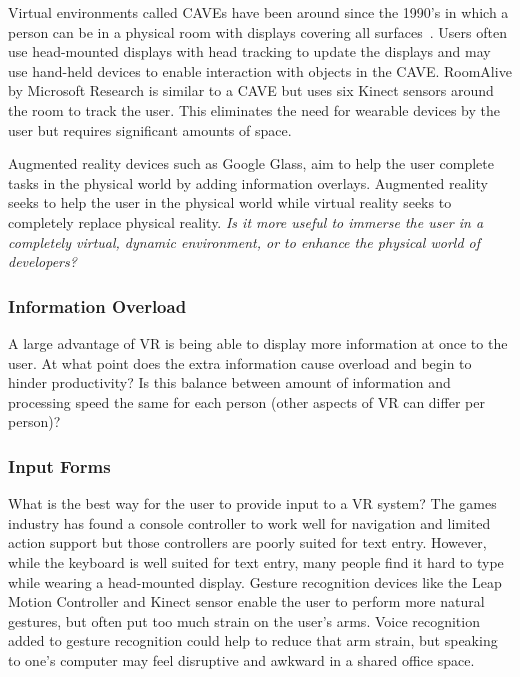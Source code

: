 \documentclass[conference]{IEEEtran}
\begin{document}
Virtual environments called CAVEs have been around since the 1990's in which a person can be in a physical room with displays covering all surfaces~\cite{Cruz-Neira:CAVE}.  
Users often use head-mounted displays with head tracking to update the displays and may use hand-held devices to enable interaction with objects in the CAVE.
RoomAlive by Microsoft Research is similar to a CAVE but uses six Kinect sensors around the room to track the user.  This eliminates the need for wearable devices by the user but requires significant amounts of space.~\cite{Jones:RoomAlive}

Augmented reality devices such as Google Glass, aim to help the user complete tasks in the physical world by adding information overlays. 
Augmented reality seeks to help the user in the physical world while virtual reality seeks to completely replace physical reality. 
\emph{Is it more useful to immerse the user in a completely virtual, dynamic environment, or to enhance the physical world of developers?}

\subsubsection{Information Overload}
A large advantage of VR is being able to display more information at once to the user.  
At what point does the extra information cause overload and begin to hinder productivity?  
Is this balance between amount of information and processing speed the same for each person (other aspects of VR can differ per person)?


\subsubsection{Input Forms}
What is the best way for the user to provide input to a VR system? 
The games industry has found a console controller to work well for navigation and limited action support but those controllers are poorly suited for text entry. 
However, while the keyboard is well suited for text entry, many people find it hard to type while wearing a head-mounted display. 
Gesture recognition devices like the Leap Motion Controller and Kinect sensor enable the user to perform more natural gestures, but often put too much strain on the user's arms. 
Voice recognition added to gesture recognition could help to reduce that arm strain, but speaking to one's computer may feel disruptive and awkward in a shared office space.
\end{document}
